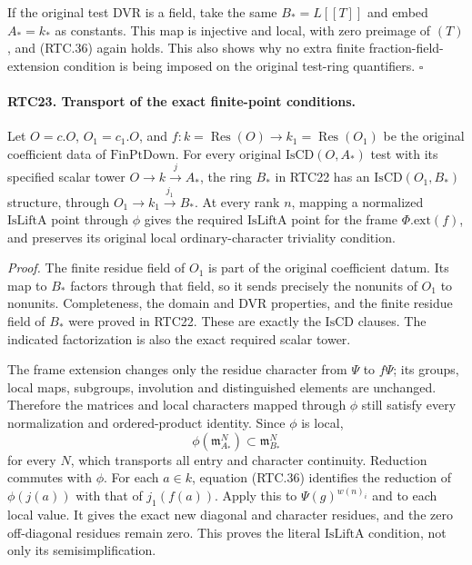 If the original test DVR is a field, take the same
\(B_*=L[[T]]\) and embed \(A_*=k_*\) as constants.
This map is injective and local, with zero preimage of \((T)\),
and (RTC.36) again holds.  This also shows why no extra finite
fraction-field-extension condition is being imposed on the
original test-ring quantifiers. \hfill\(\square\)

\paragraph{RTC23. Transport of the exact finite-point conditions.}
\label{claim:RTC23}
Let \(O=c.O\), \(O_1=c_1.O\), and
\(f:k=\operatorname{Res}(O)\to
 k_1=\operatorname{Res}(O_1)\) be the original coefficient
data of \(\mathrm{FinPtDown}\).  For every original
\(\mathrm{IsCD}(O,A_*)\) test with its specified scalar
tower \(O\to k\xrightarrow{j}A_*\), the ring \(B_*\)
in RTC22 has an \(\mathrm{IsCD}(O_1,B_*)\) structure, through
\(O_1\to k_1\xrightarrow{j_1}B_*\).  At every rank \(n\),
mapping a normalized \(\mathrm{IsLiftA}\) point through
\(\phi\) gives the required \(\mathrm{IsLiftA}\) point for
the frame \(\Phi.\mathrm{ext}(f)\), and preserves its original
local ordinary-character triviality condition.

\emph{Proof.}
The finite residue field of \(O_1\) is part of the original
coefficient datum.  Its map to \(B_*\) factors through that
field, so it sends precisely the nonunits of \(O_1\) to
nonunits.  Completeness, the domain and DVR properties, and the
finite residue field of \(B_*\) were proved in RTC22.  These
are exactly the \(\mathrm{IsCD}\) clauses.  The indicated
factorization is also the exact required scalar tower.

The frame extension changes only the residue character from
\(\Psi\) to \(f\Psi\); its groups, local maps, subgroups,
involution and distinguished elements are unchanged.  Therefore
the matrices and local characters mapped through \(\phi\)
still satisfy every normalization and ordered-product identity.
Since \(\phi\) is local,
\[
 \phi(\mathfrak m_{A_*}^N)\subset\mathfrak m_{B_*}^N
                                                        \tag{RTC.37}
\]
for every \(N\), which transports all entry and character
continuity.  Reduction commutes with \(\phi\).  For each
\(a\in k\), equation (RTC.36) identifies the reduction of
\(\phi(j(a))\) with that of \(j_1(f(a))\).
Apply this to \(\Psi(g)^{w(n)_i}\) and to each local value.
It gives the exact new diagonal and character residues, and
the zero off-diagonal residues remain zero.  This proves the
literal \(\mathrm{IsLiftA}\) condition, not only its
semisimplification.

